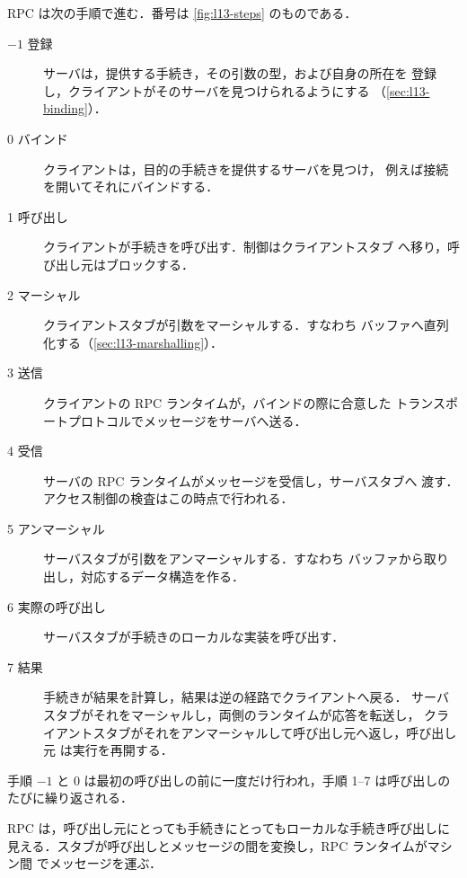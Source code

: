 \documentclass[../main.tex]{subfiles}
\begin{document}
RPC は次の手順で進む．番号は \cref{fig:l13-steps} のものである．
\begin{description}
  \item[$-1$ 登録] サーバは，提供する手続き，その引数の型，および自身の所在を
    登録し，クライアントがそのサーバを見つけられるようにする
    （\cref{sec:l13-binding}）．
  \item[0 バインド] クライアントは，目的の手続きを提供するサーバを見つけ，
    例えば接続を開いてそれにバインドする．
  \item[1 呼び出し] クライアントが手続きを呼び出す．制御はクライアントスタブ
    へ移り，呼び出し元はブロックする．
  \item[2 マーシャル] クライアントスタブが引数をマーシャルする．すなわち
    バッファへ直列化する（\cref{sec:l13-marshalling}）．
  \item[3 送信] クライアントの RPC ランタイムが，バインドの際に合意した
    トランスポートプロトコルでメッセージをサーバへ送る．
  \item[4 受信] サーバの RPC ランタイムがメッセージを受信し，サーバスタブへ
    渡す．アクセス制御の検査はこの時点で行われる．
  \item[5 アンマーシャル] サーバスタブが引数をアンマーシャルする．すなわち
    バッファから取り出し，対応するデータ構造を作る．
  \item[6 実際の呼び出し] サーバスタブが手続きのローカルな実装を呼び出す．
  \item[7 結果] 手続きが結果を計算し，結果は逆の経路でクライアントへ戻る．
    サーバスタブがそれをマーシャルし，両側のランタイムが応答を転送し，
    クライアントスタブがそれをアンマーシャルして呼び出し元へ返し，呼び出し元
    は実行を再開する．
\end{description}
手順 $-1$ と 0 は最初の呼び出しの前に一度だけ行われ，手順 1--7 は呼び出しの
たびに繰り返される．

\begin{keypoint}
  RPC は，呼び出し元にとっても手続きにとってもローカルな手続き呼び出しに
  見える．スタブが呼び出しとメッセージの間を変換し，RPC ランタイムがマシン間
  でメッセージを運ぶ．
\end{keypoint}
\end{document}
